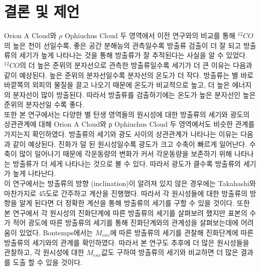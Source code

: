 \section{결론 및 제언}

Orion A Cloud와 $\rho$ Ophiuchus Cloud 두 영역에서 이전 연구와의 비교를 통해 $^{12}CO$의 높은 천이 선일수록, 좋은 공간 분해능의 관측일수록 방출류 검출이 더 잘 되고 방출류의 세기가 높게 나타나는 것을 통해 방출류가 잘 추적된다는 사실을 알 수 있었다. $^{12}CO$의 더 높은 준위의 분자선으로 관측한 방출류일수록 세기가 더 큰 이유는 다음과 같이 예상된다. 높은 준위의 분자선일수록 분자선의 온도가 더 작다. 방출류는 별 바로 바깥쪽의 외피의 물질을 끌고 나오기 때문에 온도가 비교적으로 높고, 더 높은 에너지의 분자선이 많이 방출된다. 따라서 방출류를 검출하기에는 온도가 높은 분자선인 높은 준위의 분자선일 수록 좋다.\\
또한 본 연구에서는 다양한 별 탄생 영역들의 원시성에 대한 방출류의 세기와 광도의 상관관계에 대해 Orion A Cloud와 ρ Ophiuchus Cloud 두 영역에서도 비슷한 관계를 가지는지 확인하였다. 방출류의 세기와 광도 사이의 상관관계가 나타나는 이유는 다음과 같이 예상된다. 진화가 덜 된 원시성일수록 광도가 크고 수축이 빠르게 일어난다. 수축이 많이 일어나기 때문에 각운동량의 변화가 커서 각운동량을 보존하기 위해 나타나는 방출류가 더 세게 나타나는 것으로 볼 수 있다. 따라서 광도가 클수록 방출류의 세기가 높게 나타난다.\\


이 연구에서는 방출류의 방향 (inclination)이 알려져 있지 않은 경우에는 Takahashi와 마찬가지로 45도로 간주하고 계산을 진행했다. 따라서 각 원시성들에 대한 방출류의 방향을 알게 된다면 더 정확한 계산을 통해 방출류의 세기를 구할 수 있을 것이다. 또한 본 연구에서 각 원시성의 진화단계에 따른 방출류의 세기를 살펴보려 했지만 표본의 수가 적어  광도에 따른 방출류의 세기를 통해 진화단계와의 관계성을 살펴보는데에 어려움이 있었다. Bontemps에서는	$M_{env}$에 따른 방출류의 세기를 관찰해 진화단계에 따른 방출류의 세기와의 관계를 확인하였다. 따라서 본 연구도 추후에 더 많은 원시성들을 관찰하고, 각 원시성에 대한 $M_{env}$값도 구하여 방출류의 세기와 비교하면 더 많은 결과를 도출 할 수 있을 것이다.